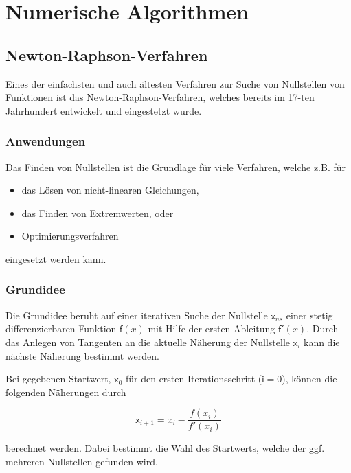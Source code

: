 \documentclass[
  letterpaper,
  DIV=11,
  numbers=noendperiod]{scrreprt}
\providecommand{\tightlist}{%
  \setlength{\itemsep}{0pt}\setlength{\parskip}{0pt}}\usepackage{longtable,booktabs,array}
\begin{document}
\chapter{Numerische Algorithmen}\label{numerische-algorithmen}

\section{Newton-Raphson-Verfahren}\label{newton-raphson-verfahren}

Eines der einfachsten und auch ältesten Verfahren zur Suche von
Nullstellen von Funktionen ist das
\href{https://de.wikipedia.org/wiki/Newtonverfahren}{Newton-Raphson-Verfahren},
welches bereits im 17-ten Jahrhundert entwickelt und eingestetzt wurde.

\subsection{Anwendungen}\label{anwendungen}

Das Finden von Nullstellen ist die Grundlage für viele Verfahren, welche
z.B. für

\begin{itemize}
\tightlist
\item
  das Lösen von nicht-linearen Gleichungen,
\item
  das Finden von Extremwerten, oder
\item
  Optimierungsverfahren
\end{itemize}

eingesetzt werden kann.

\subsection{Grundidee}\label{grundidee}

Die Grundidee beruht auf einer iterativen Suche der Nullstelle
\(\mathsf x_{ns}\) einer stetig differenzierbaren Funktion
\(\mathsf f(x)\) mit Hilfe der ersten Ableitung \(\mathsf f'(x)\). Durch
das Anlegen von Tangenten an die aktuelle Näherung der Nullstelle
\(\mathsf x_i\) kann die nächste Näherung bestimmt werden.

Bei gegebenen Startwert, \(\mathsf x_0\) für den ersten
Iterationsschritt (\(\mathsf i=0\)), können die folgenden Näherungen
durch

\[\mathsf x_{i+1} = x_i - \frac{f(x_i)}{f'(x_i)} \]

berechnet werden. Dabei bestimmt die Wahl des Startwerts, welche der
ggf. mehreren Nullstellen gefunden wird.
\end{document}
